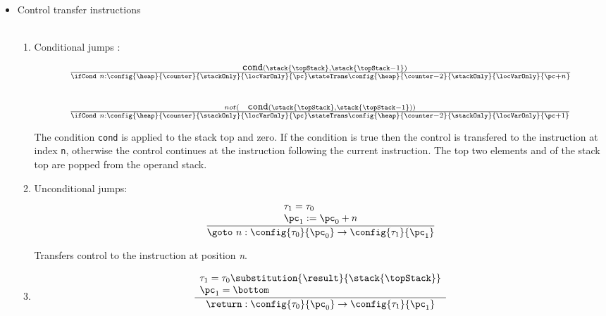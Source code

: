 \begin{itemize}
       \item Control transfer instructions \\\\

        \begin{enumerate}
            \item Conditional jumps : \ifCond


        $$ \begin{array}{l}
                 \frac{ \mbox{ \rm \texttt{ cond}}( \stack{\topStack}, \stack{\topStack - 1}) } 			       		               
                      {\ifCond \ n : \config{\heap }{\counter}{\stackOnly}{\locVarOnly}{\pc}
		                      \stateTrans 
				      \config{\heap}{\counter - 2}{\stackOnly}{\locVarOnly}{\pc + n}} 
                \\
                \\
		\\
                 \frac{  not (\mbox{ \rm \texttt{ cond}}( \stack{\topStack}, \stack{\topStack - 1})) }		                             
                     {\ifCond \ n : \config{\heap}{\counter}{\stackOnly}{\locVarOnly}{\pc} 
		                    \stateTrans 
                                    \config{\heap}{\counter - 2}{\stackOnly}{\locVarOnly}{\pc + 1}} 
          \end{array} $$
            

	    The condition \texttt{cond} is applied to the stack top and zero. If the condition is true then the control is transfered to the instruction
	    at index \texttt{n}, otherwise the control continues at the instruction following the current instruction. The top two elements \stack{\topStack} and
              of the stack top are popped from the operand stack.
 
        \item Unconditional jumps: \goto \\
            $$ \frac{ \begin{array}{l} \tau_{1} = \tau_{0} \\     
                                       \pc_1 :=  \pc_0 +  n 
                      \end{array} }
	          {\goto \ n: \config{\tau_{0}}{\pc_0} \rightarrow \config{\tau_{1}}{\pc_1}}$$
   
             Transfers control to the instruction at position \textit{n}.


      \item \return
        $$ \frac{ \begin{array}{l}
		        \tau_{1} = \tau_{0} \substitution{\result}{\stack{\topStack} }  \\
		        \pc_1 = \bottom 
                   \end{array}} 
            {\return :\config{\tau_{0}}{\pc_0} \rightarrow \config{\tau_{1}}{\pc_1}}  $$


\end{enumerate}
\end{itemize}

